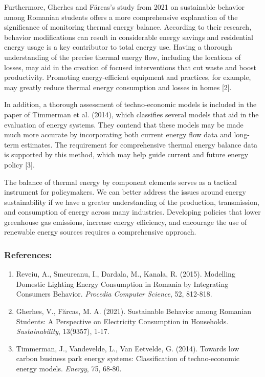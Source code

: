 \documentclass{article} %
\begin{document}
Furthermore, Gherhes and Fărcas's study from 2021 on sustainable behavior among Romanian students offers a more comprehensive explanation of the significance of monitoring thermal energy balance. According to their research, behavior modifications can result in considerable energy savings and residential energy usage is a key contributor to total energy use. Having a thorough understanding of the precise thermal energy flow, including the locations of losses, may aid in the creation of focused interventions that cut waste and boost productivity. Promoting energy-efficient equipment and practices, for example, may greatly reduce thermal energy consumption and losses in homes [2].

In addition, a thorough assessment of techno-economic models is included in the paper of Timmerman et al. (2014), which classifies several models that aid in the evaluation of energy systems. They contend that these models may be made much more accurate by incorporating both current energy flow data and long-term estimates. The requirement for comprehensive thermal energy balance data is supported by this method, which may help guide current and future energy policy [3].

The balance of thermal energy by component elements serves as a tactical instrument for policymakers. We can better address the issues around energy sustainability if we have a greater understanding of the production, transmission, and consumption of energy across many industries. Developing policies that lower greenhouse gas emissions, increase energy efficiency, and encourage the use of renewable energy sources requires a comprehensive approach.

\subsubsection*{References:}

\begin{enumerate}
    \item Reveiu, A., Smeureanu, I., Dardala, M., Kanala, R. (2015). Modelling Domestic Lighting Energy Consumption in Romania by Integrating Consumers Behavior. \textit{Procedia Computer Science}, 52, 812-818. 
    \item Gherhes, V., Fărcas, M. A. (2021). Sustainable Behavior among Romanian Students: A Perspective on Electricity Consumption in Households. \textit{Sustainability}, 13(9357), 1-17.
    \item Timmerman, J., Vandevelde, L., Van Eetvelde, G. (2014). Towards low carbon business park energy systems: Classification of techno-economic energy models. \textit{Energy}, 75, 68-80.
\end{enumerate}
\end{document}
